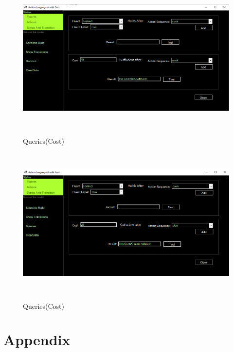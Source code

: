 \documentclass[11pt]{article}
\begin{document}
	\begin{figure}[H]
		\centering
		\includegraphics[width=6in,height=3in]{./testImages/Example3/img10.png}
		\label{Figure:f03.10}
		\caption{Queries(Cost)}
	\end{figure}
	\begin{figure}[H]
		\centering
		\includegraphics[width=6in,height=3in]{./testImages/Example3/img11.png}
		\label{Figure:f03.11}
		\caption{Queries(Cost)}
	\end{figure}
	\newpage
	\section{Appendix}	
	\begin{appendix}
		\listoffigures
		\listoftables
	\end{appendix}
		 
\end{document}
